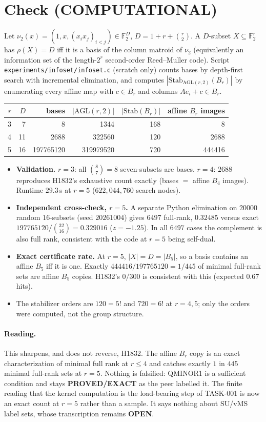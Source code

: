\documentclass[11pt]{article}
\begin{document}
\section*{Check (COMPUTATIONAL)}
Let $\nu_2(x)=(1,x,(x_ix_j)_{i<j})\in\mathbb F_2^{D}$, $D=1+r+\binom r2$. A $D$-subset $X\subseteq\mathbb F_2^r$ has $\rho(X)=D$ iff it is a basis of the column matroid of $\nu_2$ (equivalently an information set of the length-$2^r$ second-order Reed--Muller code). Script \texttt{experiments/infoset/infoset.c} (scratch only) counts bases by depth-first search with incremental elimination, and computes $|\mathrm{Stab}_{\mathrm{AGL}(r,2)}(B_r)|$ by enumerating every affine map with $c\in B_r$ and columns $Ae_i+c\in B_r$.
\begin{center}
\begin{tabular}{rrrrrr}
$r$ & $D$ & bases & $|\mathrm{AGL}(r,2)|$ & $|\mathrm{Stab}(B_r)|$ & affine $B_r$ images\\\hline
3 & 7 & 8 & 1344 & 168 & 8\\
4 & 11 & 2688 & 322560 & 120 & 2688\\
5 & 16 & 197765120 & 319979520 & 720 & 444416
\end{tabular}
\end{center}
\begin{itemize}
\item \textbf{Validation.} $r=3$: all $\binom87=8$ seven-subsets are bases. $r=4$: $2688$ reproduces H1832's exhaustive count exactly (bases $=$ affine $B_4$ images). Runtime $29.3$\,s at $r=5$ ($622{,}044{,}760$ search nodes).
\item \textbf{Independent cross-check, $r=5$.} A separate Python elimination on $20000$ random $16$-subsets (seed $20261004$) gives $6497$ full-rank, $0.32485$ versus exact $197765120/\binom{32}{16}=0.329016$ ($z=-1.25$). In all $6497$ cases the complement is also full rank, consistent with the code at $r=5$ being self-dual.
\item \textbf{Exact certificate rate.} At $r=5$, $|X|=D=|B_5|$, so a basis contains an affine $B_5$ iff it is one. Exactly $444416/197765120=1/445$ of minimal full-rank sets are affine $B_5$ copies. H1832's $0/300$ is consistent with this (expected $0.67$ hits).
\item The stabilizer orders are $120=5!$ and $720=6!$ at $r=4,5$; only the orders were computed, not the group structure.
\end{itemize}

\paragraph{Reading.} This sharpens, and does not reverse, H1832. The affine $B_r$ copy is an exact characterization of minimal full rank at $r\le4$ and catches exactly $1$ in $445$ minimal full-rank sets at $r=5$. Nothing is falsified: QMINOR1 is a sufficient condition and stays \textbf{PROVED/EXACT} as the peer labelled it. The finite reading that the kernel computation is the load-bearing step of TASK-001 is now an exact count at $r=5$ rather than a sample. It says nothing about SU/vMS label sets, whose transcription remains \textbf{OPEN}.
\end{document}
